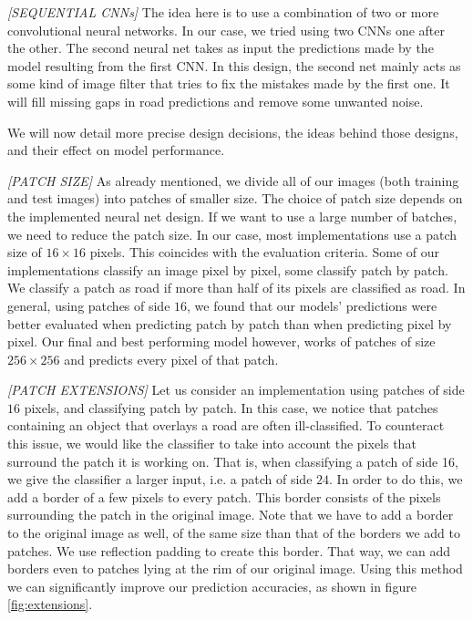 \documentclass[10pt,conference,compsocconf]{IEEEtran}
\begin{document}
\smallskip
\textit{[SEQUENTIAL CNNs]}  
The idea here is to use a combination of two or more convolutional neural networks. In our case, we tried using two CNNs one after the other. The second neural net takes as input the predictions made by the model resulting from the first CNN. In this design, the second net mainly acts as some kind of image filter that tries to fix the mistakes made by the first one. It will fill missing gaps in road predictions and remove some unwanted noise.

\smallskip
We will now detail more precise design decisions, the ideas behind those designs, and their effect on model performance.

\smallskip
\textit{[PATCH SIZE]} 
As already mentioned, we divide all of our images (both training and test images) into patches of smaller size. The choice of patch size depends on the implemented neural net design. If we want to use a large number of batches, we need to reduce the patch size. In our case, most implementations use a patch size of $16 \times 16$ pixels. This coincides with the evaluation criteria. Some of our implementations classify an image pixel by pixel, some classify patch by patch. We classify a patch as road if more than half of its pixels are classified as road. In general, using patches of side $16$, we found that our models' predictions were better evaluated when predicting patch by patch than when predicting pixel by pixel. Our final and best performing model however, works of patches of size $256 \times 256$ and predicts every pixel of that patch.

\smallskip
\textit{[PATCH EXTENSIONS]} 
Let us consider an implementation using patches of side $16$ pixels, and classifying patch by patch. In this case, we notice that patches containing an object that overlays a road are often ill-classified. To counteract this issue, we would like the classifier to take into account the pixels that surround the patch it is working on. That is, when classifying a patch of side 16, we give the classifier a larger input, i.e. a patch of side $24$. In order to do this, we add a border of a few pixels to every patch. This border consists of the pixels surrounding the patch in the original image. Note that we have to add a border to the original image as well, of the same size than that of the borders we add to patches. We use reflection padding to create this border. That way, we can add borders even to patches lying at the rim of our original image. Using this method we can significantly improve our prediction accuracies, as shown in figure \ref{fig:extensions}.
\end{document}
